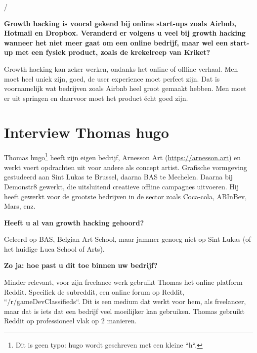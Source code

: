 /
	
\textbf{Growth hacking is vooral gekend bij online start-ups zoals Airbnb, Hotmail en Dropbox. Veranderd er volgens u veel bij growth hacking wanneer het niet meer gaat om een online bedrijf, maar wel een start-up met een fysiek product, zoals de krekelreep van Kriket?}
	
Growth hacking kan zeker werken, ondanks het online of offline verhaal. Men moet heel uniek zijn, goed, de user experience moet perfect zijn. Dat is voornamelijk wat bedrijven zoals Airbnb heel groot gemaakt hebben. Men moet er uit springen en daarvoor moet het product écht goed zijn.

\section{Interview Thomas hugo}
\label{sec:interview-thomas-hugo}

Thomas hugo\footnote{Dit is geen typo: hugo wordt geschreven met een kleine ``h``. } heeft zijn eigen bedrijf, Arnesson Art (\href{https://arnesson.art/}{https://arnesson.art}) en werkt voert opdrachten uit voor andere als concept artist. Grafische vormgeving gestudeerd aan Sint Lukas te Brussel, daarna BAS te Mechelen. Daarna bij Demonstr8 gewerkt, die uitsluitend creatieve offline campagnes uitvoeren. Hij heeft gewerkt voor de grootste bedrijven in de sector zoals Coca-cola, ABInBev, Mars, enz.

\textbf{Heeft u al van growth hacking gehoord?}
	
Geleerd op BAS, Belgian Art School, maar jammer genoeg niet op Sint Lukas (of het huidige Luca School of Arts). 
	
\textbf{Zo ja: hoe past u dit toe binnen uw bedrijf?}
	
Minder relevant, voor zijn freelance werk gebruikt Thomas het online platform Reddit. Specifiek de subreddit, een online forum op Reddit, ``/r/gameDevClassifieds``. Dit is een medium dat werkt voor hem, als freelancer, maar dat is iets dat een bedrijf veel moeilijker kan gebruiken. Thomas gebruikt Reddit op professioneel vlak op 2 manieren. 
	
